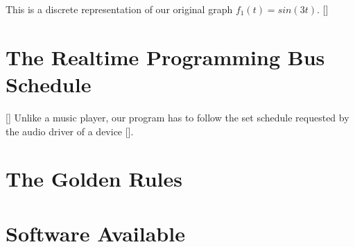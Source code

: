 This is a discrete representation of our original graph \(f_1(t) = sin(3t)\). []



\section{The Realtime Programming Bus Schedule}
[] Unlike a music player, our program has to follow the set schedule requested by the audio driver of a device [].
\section{The Golden Rules}
\section{Software Available}
